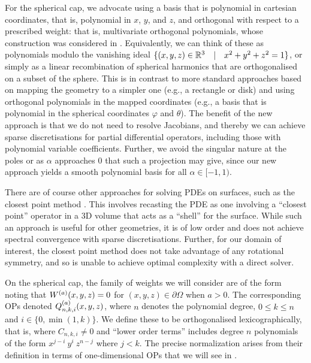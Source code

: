 For the spherical cap, we advocate using a basis that is polynomial in cartesian coordinates, that is, polynomial in $x$, $y$, and $z$, and orthogonal with respect to a prescribed weight: that is, multivariate orthogonal polynomials, whose construction was considered in \cite{olver2020orthogonal}. Equivalently, we can think of these as polynomials modulo the vanishing ideal $\{ (x,y,z) \in \mathbb{R}^3 \quad | \quad x^2 + y^2 + z^2 = 1 \}$, or simply as a linear recombination of spherical harmonics that are orthogonalised on a subset of the sphere. This is in contrast to more standard approaches based on mapping the geometry to a simpler one (e.g., a rectangle or disk) and using orthogonal polynomials in the mapped coordinates (e.g., a basis that is polynomial in the spherical coordinates $\varphi$ and $\theta$). The benefit of the new approach is that we do not need to resolve Jacobians, and thereby we can achieve sparse discretisations for partial differential operators, including those with polynomial variable coefficients. Further, we avoid the singular nature at the poles or as $\alpha$ approaches $0$ that such a projection may give, since our new approach yields a smooth polynomial basis for all $\alpha \in [-1,1)$. 

There are of course other approaches for solving PDEs on surfaces, such as the closest point method \cite{macdonald2010implicit, macdonald2008level}. This involves recasting the PDE as one involving a \enquote{closest point} operator in a 3D volume that acts as a \enquote{shell} for the surface. While such an approach is useful for other geometries, it is of low order and does not achieve spectral convergence with sparse discretisations. Further, for our domain of interest, the closest point method does not take advantage of any rotational symmetry, and so is unable to achieve optimal complexity with a direct solver.

On the spherical cap, the family of weights we will consider are of the form
noting that $W^{(a)}(x,y,z) = 0$ for $(x,y,z) \in \partial \Omega$ when $a > 0$. The corresponding OPs denoted $Q_{n,k,i}^{(a)}(x,y,z)$, where $n$ denotes the polynomial degree, $0 \le k \le n$ and $i \in \{0, \min(1,k)\}$. We define these to be orthogonalised lexicographically, that is,
where $C_{n,k,i} \neq 0$ and \enquote{lower order terms} includes degree $n$ polynomials of the form $x^{j - i} \: y^{i} \: z^{n-j}$ where $j < k$. The precise normalization arises from their definition in terms of one-dimensional OPs that we will see in . 

